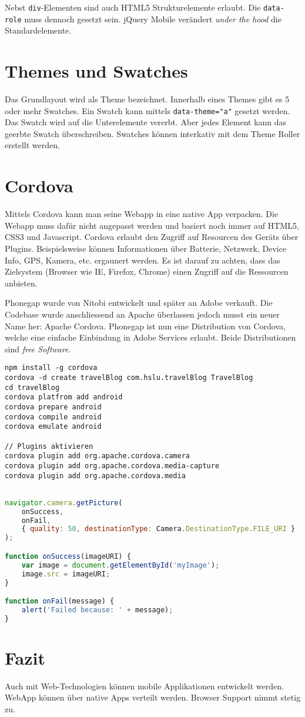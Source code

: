 Nebst \verb|div|-Elementen sind auch HTML5 Strukturelemente erlaubt. Die \verb|data-role| muss dennoch gesetzt sein. jQuery Mobile verändert \textit{under the hood} die Standardelemente.

\section{Themes und Swatches}
Das Grundlayout wird als Theme bezeichnet. Innerhalb eines Themes gibt es 5 oder mehr Swatches. Ein Swatch kann mittels \verb|data-theme="a"| gesetzt werden. Das Swatch wird auf die Unterelemente vererbt. Aber jedes Element kann das geerbte Swatch überschreiben. Swatches können interkativ mit dem Theme Roller erstellt werden.

\section{Cordova}
Mittels Cordova kann man seine Webapp in eine native App verpacken. Die Webapp muss dafür nicht angepasst werden und basiert noch immer auf HTML5, CSS3 und Javascript. Cordova erlaubt den Zugriff auf Resourcen des Geräts über Plugins. Beispielsweise können Informationen über Batterie, Netzwerk, Device Info, GPS, Kamera, etc. ergaunert werden. Es ist darauf zu achten, dass das Zielsystem (Browser wie IE, Firefox, Chrome) einen Zugriff auf die Ressourcen anbieten.

Phonegap wurde von Nitobi entwickelt und später an Adobe verkauft. Die Codebase wurde anschliessend an Apache überlassen jedoch musst ein neuer Name her: Apache Cordova. Phonegap ist nun eine Distribution von Cordova, welche eine einfache Einbindung in Adobe Services erlaubt. Beide Distributionen sind \textit{free Software}.

\begin{lstlisting}[label=lst:Cordova,caption=Cordova]
npm install -g cordova
cordova -d create travelBlog com.hslu.travelBlog TravelBlog
cd travelBlog
cordova platfrom add android
cordova prepare android
cordova compile android
cordova emulate android

// Plugins aktivieren
cordova plugin add org.apache.cordova.camera
cordova plugin add org.apache.cordova.media-capture
cordova plugin add org.apache.cordova.media
\end{lstlisting}

\begin{lstlisting}[language=Javascript,label=lst:cordova-javascript,caption=Cordova Javascript Camera]

navigator.camera.getPicture(
	onSuccess,
	onFail, 
	{ quality: 50, destinationType: Camera.DestinationType.FILE_URI }
);

function onSuccess(imageURI) {
	var image = document.getElementById('myImage');
	image.src = imageURI;
}

function onFail(message) {
	alert('Failed because: ' + message);
}
\end{lstlisting}

\section{Fazit}
Auch mit Web-Technologien können mobile Applikationen entwickelt werden. WebApp können über native Apps verteilt werden. Browser Support nimmt stetig zu. 